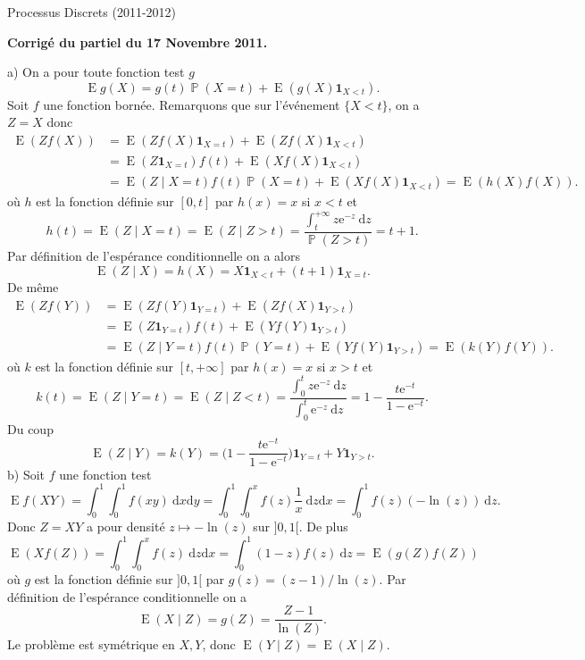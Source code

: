 \documentclass[a4, 12pt]{article}
\providecommand{\prob}{\mathop{\mathbb P{}}\nolimits}
\providecommand{\E}{\mathop{\mathrm{E}{}}\nolimits}
\providecommand{\E}{\mathop{\mathbb E{}}\nolimits}
\providecommand{\prob}{\mathop{\mathbb P{}}\nolimits}
\providecommand{\drm}{\mathrm{d}}
\providecommand{\e}{\mathrm{e}}
\begin{document}
\noindent Processus Discrets (2011-2012)


\bigskip

\vspace{1cm}




\centerline{\textbf{Corrigé du partiel du 17 Novembre 2011.}}




\bigskip
{} a)
On a pour toute fonction test $g$
\[ \E g (X) =  g (t) \prob ( X=t ) +\E ( g(X) \mathbf{1}_{ X < t }  ) . \]  
Soit $f$ une fonction bornée. Remarquons que sur l'événement $\{X<t\}$, on a $Z=X$ donc
\[
\begin{split}
\E ( Z f ( X ) ) & = \E ( Z f (X) \mathbf{1}_{X = t} ) + \E ( Z f(X ) \mathbf{1}_{X< t} ) \\
&  =  \E ( Z \mathbf{1}_{X= t} ) f(t) + \E ( X f(X) \mathbf{1}_{ X < t } )    \\
& = \E ( Z \mid X= t ) f(t)  \prob ( X = t )  + \E ( X f(X) \mathbf{1}_{ X < t }  ) =  \E ( h(X) f (X)  ) .
\end{split}
\]
où $h$ est la fonction définie sur $[0,t]$ par $h(x) = x$ si $x< t$ et 
\[
h(t) = \E ( Z \mid X=t ) = \E ( Z \mid Z >t ) = \frac{ \int_t^{+\infty} z \e^{-z} \ \drm z }{ \prob ( Z >t ) } = t+1.
\]
Par définition de l'espérance conditionnelle on a alors
\[
\E ( Z \mid X ) = h(X) = X \mathbf{1}_{X<t} + (t+1) \mathbf{1}_{X=t} . 
\]
De même
\[
\begin{split}
\E ( Z f ( Y ) ) & = \E ( Z f (Y) \mathbf{1}_{Y = t} ) + \E ( Z f(X ) \mathbf{1}_{Y > t} ) \\
&  =  \E ( Z \mathbf{1}_{Y= t} ) f(t) + \E ( Y f(Y) \mathbf{1}_{ Y > t } )    \\
& = \E ( Z \mid Y= t ) f(t)  \prob ( Y = t )  + \E ( Y f(Y) \mathbf{1}_{ Y > t }  ) =  \E ( k(Y) f (Y)  ) .
\end{split}
\]
où $k$ est la fonction définie sur $[t,+\infty]$ par $h(x) = x$ si $x>t$ et 
\[
k(t) = \E ( Z \mid Y=t ) = \E ( Z \mid Z < t ) = 
\frac{ \int_0^{t} z \e^{-z} \ \drm z }{ \int_0^{t} \e^{-z} \ \drm z } = 1 - \frac{  t  \e^{-t}  }{ 1 - \e^{-t} }.
\]
Du coup
\[
\E ( Z \mid Y ) = k(Y) = \bigl(  1 - \frac{  t  \e^{-t}  }{ 1 - \e^{-t} } \bigr) \mathbf{1}_{Y=t} + Y \mathbf{1}_{Y>t} .
\]
b)
Soit $f$ une fonction test
\[ \E f (XY)  = \int_0^1 \int_0^1 f(xy) \ \drm x \drm y = \int_0^1 \int_0^x f(z) \frac{1}{x} \ \drm z \drm x = \int_0^1 f(z) (-\ln ( z) ) \ \drm z .
\]
Donc $Z = XY$ a pour densité $z \mapsto -\ln(z)$ sur $]0,1[$. De plus
\[
\E ( X f ( Z ) ) = \int_0^1 \int_0^x  f(z) \ \drm z \drm x = \int_0^1 (1-z) f(z) \  \drm z = \E ( g(Z) f(Z) )
\]
où $g$ est la fonction définie sur $]0,1[$ par $g (z) = (z-1) / \ln(z)$. Par définition de l'espérance conditionnelle
on a
\[ 
\E ( X \mid Z  )  =  g(Z ) =  \frac{Z-1}{\ln(Z)} . 
\]
Le problème est symétrique en $X,Y$, donc $\E ( Y \mid Z )= \E ( X \mid Z)$.   
\end{document}
